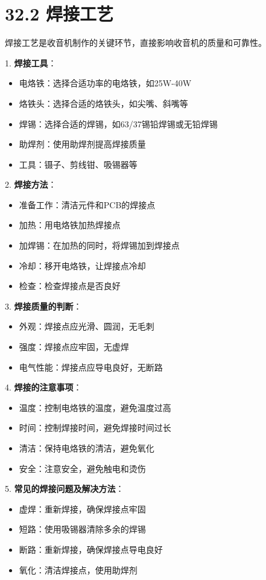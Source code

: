 \documentclass[12pt,UTF8]{ctexbook}
\begin{document}
\section*{32.2 焊接工艺}

焊接工艺是收音机制作的关键环节，直接影响收音机的质量和可靠性。

1. \textbf{焊接工具}：
   \begin{itemize}[leftmargin=3.5em]
   \item 电烙铁：选择合适功率的电烙铁，如25W-40W
   \item 烙铁头：选择合适的烙铁头，如尖嘴、斜嘴等
   \item 焊锡：选择合适的焊锡，如63/37锡铅焊锡或无铅焊锡
   \item 助焊剂：使用助焊剂提高焊接质量
   \item 工具：镊子、剪线钳、吸锡器等
   \end{itemize}

2. \textbf{焊接方法}：
   \begin{itemize}[leftmargin=3.5em]
   \item 准备工作：清洁元件和PCB的焊接点
   \item 加热：用电烙铁加热焊接点
   \item 加焊锡：在加热的同时，将焊锡加到焊接点
   \item 冷却：移开电烙铁，让焊接点冷却
   \item 检查：检查焊接点是否良好
   \end{itemize}

3. \textbf{焊接质量的判断}：
   \begin{itemize}[leftmargin=3.5em]
   \item 外观：焊接点应光滑、圆润，无毛刺
   \item 强度：焊接点应牢固，无虚焊
   \item 电气性能：焊接点应导电良好，无断路
   \end{itemize}

4. \textbf{焊接的注意事项}：
   \begin{itemize}[leftmargin=3.5em]
   \item 温度：控制电烙铁的温度，避免温度过高
   \item 时间：控制焊接时间，避免焊接时间过长
   \item 清洁：保持电烙铁的清洁，避免氧化
   \item 安全：注意安全，避免触电和烫伤
   \end{itemize}

5. \textbf{常见的焊接问题及解决方法}：
   \begin{itemize}[leftmargin=3.5em]
   \item 虚焊：重新焊接，确保焊接点牢固
   \item 短路：使用吸锡器清除多余的焊锡
   \item 断路：重新焊接，确保焊接点导电良好
   \item 氧化：清洁焊接点，使用助焊剂
   \end{itemize}
\end{document}
